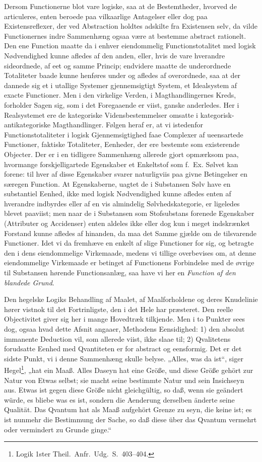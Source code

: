 \documentclass[12pt]{book}
\newcommand{\opage}[1]{\marginnote{\footnotesize\textit{[#1]}}}
\begin{document}
Dersom Functionerne blot vare logiske, saa at de Bestemtheder, hvorved de articuleres, enten beroede paa
vilkaarlige Antagelser eller dog paa Existensreflexer, der ved Abstraction holdtes adskilte fra
Existensen selv, da vilde Functionernes indre Sammenhæng ogsaa være at bestemme abstract rationelt. Den
ene Function maatte da i enhver eiendommelig Functionstotalitet med logisk Nødvendighed kunne afledes af
den anden, eller, hvis de vare hverandre sideordnede, af eet og samme Princip; endvidere maatte de
underordnede Totaliteter baade kunne henføres under og afledes af overordnede, saa at der dannede sig et
i utallige Systemer gjennemsigtigt System, et Idealsystem af exacte Functioner. Men i den virkelige
Verden, i Magthandlingernes Kreds, forholder Sagen sig, som i det Foregaaende er viist, ganske
anderledes. Her i Realsystemet ere de kategoriske Vidensbestemmelser omsatte i
\opage{317} kategorisk-antikategoriske Magthandlinger. Følgen heraf er, at vi istedenfor Functionstotaliteter i
logisk Gjennemsigtighed faae Complexer af ueensartede Functioner, faktiske Totaliteter, Eenheder, der
ere bestemte som existerende Objecter. Der er i en tidligere Sammenhæng allerede gjort opmærksom paa,
hvormange forskjelligartede Egenskaber et Enkeltstof som f.\ Ex. Sølvet kan forene: til hver af disse
Egenskaber svarer naturligviis paa givne Betingelser en særegen Function. At Egenskaberne, uagtet de i
Substansen Sølv have en substantiel Eenhed, ikke med logisk Nødvendighed kunne afledes enten af
hverandre indbyrdes eller af en vis almindelig Sølvhedskategorie, er ligeledes blevet paaviist; men naar
de i Substansen som Stofsubstans forenede Egenskaber (Attributer og Accidenser) enten aldeles ikke eller
dog kun i meget indskrænket Forstand kunne afledes af hinanden, da maa det Samme gjælde om de tilsvarende
Functioner. Idet vi da fremhæve en enkelt af slige Functioner for sig, og betragte den i dens
eiendommelige Virkemaade, medens vi tillige overbevises om, at denne eiendommelige Virkemaade er betinget
af Functionens Forbindelse med de øvrige til Substansen hørende Functionsanlæg, saa have vi her en
\emph{Function af den blandede Grund}.

Den hegelske Logiks Behandling af Maalet, af Maalforholdene og deres Knudelinie hører vistnok til det
Fortrinligste, den i det Hele har præsteret. Den reelle Objectivitet giver sig her i mange Hovedtræk
tilkjende. Men i to Punkter sees dog, ogsaa hvad dette Afsnit angaaer, Methodens Eensidighed: 1) den
absolut immanente Deduction vil, som allerede viist, ikke slaae til; 2) Qvalitetens forudsatte Eenhed
med Qvantiteten er for abstract og eensformig. Det er det sidste Punkt, vi i denne Sammenhæng skulle
belyse. „Alles, was da ist“, siger Hegel\footnote{Logik 1ster Theil.\ Anfr.\ Udg.\ S.~403--404.}, „hat
ein Maaß. Alles Daseyn
\opage{318} hat eine Größe, und diese Größe gehört zur Natur von Etwas selbst; sie macht seine bestimmte Natur und
sein Insichseyn aus. Etwas ist gegen diese Größe nicht gleichgültig, so daß, wenn sie geändert würde, es
bliebe was es ist, sondern die Aenderung derselben änderte seine Qualität. Das Qvantum hat als Maaß
aufgehört Grenze zu seyn, die keine ist; es ist nunmehr die Bestimmung der Sache, so daß diese über das
Qvantum vermehrt oder vermindert zu Grunde ginge.“
\end{document}
